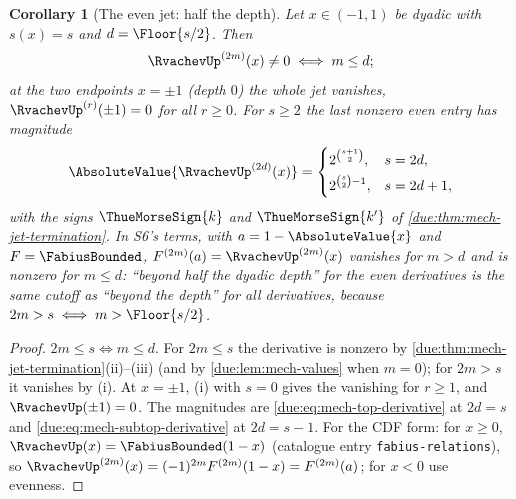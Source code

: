 \documentclass[11pt,oneside]{article}
\theoremstyle{plain}
\newtheorem{corollary}[theorem]{Corollary}
\theoremstyle{definition}
\theoremstyle{remark}
\newcommand{\dep}[1]{s\!\left(#1\right)}                    %
\begin{document}
\begin{corollary}[The even jet: half the depth]
\label{due:cor:mech-even-jet}
Let \(x\in(-1,1)\) be dyadic with \(\dep{x}=s\) and \(d=\Floor{s/2}\).  Then
\begin{equation}
 \RvachevUp^{(2m)}(x)\ne0\iff m\le d;
 \label{due:eq:mech-even-jet}
\end{equation}
at the two endpoints \(x=\pm1\) (depth \(0\)) the whole jet vanishes,
\(\RvachevUp^{(r)}(\pm1)=0\) for all \(r\ge0\).  For
\(s\ge2\) the last nonzero even entry has magnitude
\begin{equation}
 \AbsoluteValue{\RvachevUp^{(2d)}(x)}=
 \begin{cases}
 2^{\binom{s+1}{2}}, & s=2d,\\[0.3em]
 2^{\binom{s}{2}-1}, & s=2d+1,
 \end{cases}
 \label{due:eq:mech-top-even}
\end{equation}
with the signs \(\ThueMorseSign{k}\) and \(\ThueMorseSign{k'}\) of
\cref{due:thm:mech-jet-termination}.  In S6's terms, with
\(a=1-\AbsoluteValue{x}\) and \(F=\FabiusBounded\), \(F^{(2m)}(a)=\RvachevUp^{(2m)}(x)\)
vanishes for \(m>d\) and is nonzero for \(m\le d\): ``beyond half the dyadic
depth'' for the even derivatives is the same cutoff as ``beyond the depth''
for all derivatives, because \(2m>s\iff m>\Floor{s/2}\).
\end{corollary}

\begin{proof}
\(2m\le s\iff m\le d\).  For \(2m\le s\) the derivative is nonzero by
\cref{due:thm:mech-jet-termination}(ii)--(iii) (and by
\cref{due:lem:mech-values} when \(m=0\)); for \(2m>s\) it vanishes by (i).
At \(x=\pm1\), (i) with \(s=0\) gives the vanishing for \(r\ge1\), and
\(\RvachevUp(\pm1)=0\).  The magnitudes are
\cref{due:eq:mech-top-derivative} at \(2d=s\) and
\cref{due:eq:mech-subtop-derivative} at \(2d=s-1\).  For the CDF form: for
\(x\ge0\), \(\RvachevUp(x)=\FabiusBounded(1-x)\) (catalogue entry
\texttt{fabius-relations}), so \(\RvachevUp^{(2m)}(x)=(-1)^{2m}F^{(2m)}(1-x)=F^{(2m)}(a)\);
for \(x<0\) use evenness.
\end{proof}
\end{document}
